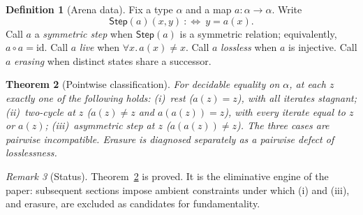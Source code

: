 \documentclass[11pt,a4paper]{article}
\theoremstyle{plain}
\newtheorem{theorem}{Theorem}[section]
\theoremstyle{definition}
\newtheorem{definition}[theorem]{Definition}
\theoremstyle{remark}
\newtheorem{remark}[theorem]{Remark}
\newcommand{\comp}{\circ}
\begin{document}
\begin{definition}[Arena data]
\label{def:arena}
Fix a type $\alpha$ and a map $a:\alpha\to\alpha$. Write
\[
  \mathsf{Step}(a)(x,y)\ :\Leftrightarrow\ y=a(x).
\]
Call $a$ a \emph{symmetric step} when $\mathsf{Step}(a)$ is a symmetric
relation; equivalently, $a\comp a=\mathrm{id}$. Call $a$ \emph{live}
when $\forall x.\, a(x)\neq x$. Call $a$ \emph{lossless} when $a$ is
injective. Call $a$ \emph{erasing} when distinct states share a
successor.
\end{definition}

\begin{theorem}[Pointwise classification]
\label{thm:class}
For decidable equality on $\alpha$, at each $z$ exactly one of the
following holds: (i)~rest ($a(z)=z$), with all iterates stagnant;
(ii)~two-cycle at $z$ ($a(z)\neq z$ and $a(a(z))=z$), with every iterate
equal to $z$ or $a(z)$; (iii)~asymmetric step at $z$ ($a(a(z))\neq z$).
The three cases are pairwise incompatible. Erasure is diagnosed
separately as a pairwise defect of losslessness.
\end{theorem}

\begin{center}
\end{center}

\begin{remark}[Status]
Theorem~\ref{thm:class} is proved. It is the eliminative engine of the
paper: subsequent sections impose ambient constraints under which (i)
and (iii), and erasure, are excluded as candidates for fundamentality.
\end{remark}
\end{document}
